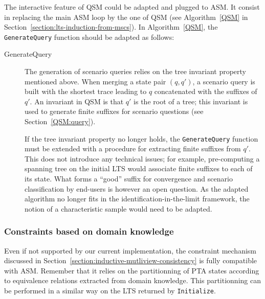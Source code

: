 The interactive feature of QSM could be adapted and plugged to ASM. It consist in replacing the main ASM loop by the one of QSM (see Algorithm~\ref{QSM} in Section~\ref{section:lts-induction-from-mscs}). In Algorithm~\ref{QSM}, the \texttt{GenerateQuery} function should be adapted as follows:
\begin{description}

\item[GenerateQuery] The generation of scenario queries relies on the tree invariant property mentioned above. When merging a state pair $(q,q')$, a scenario query is built with the shortest trace leading to $q$ concatenated with the suffixes of $q'$. An invariant in QSM is that $q'$ is the root of a tree; this invariant is used to generate finite suffixes for scenario questions (see Section~\ref{QSM:query}).

If the tree invariant property no longer holds, the \texttt{GenerateQuery} function must be extended with a procedure for extracting finite suffixes from $q'$. This does not introduce any technical issues; for example, pre-computing a spanning tree on the initial LTS would associate finite suffixes to each of its state. What forms a ``good'' suffix for convergence and scenario classification by end-users is however an open question. As the adapted algorithm no longer fits in the identification-in-the-limit framework, the notion of a characteristic sample would need to be adapted.

\end{description}

\subsubsection*{Constraints based on domain knowledge}

Even if not supported by our current implementation, the constraint mechanism discussed in Section~\ref{section:inductive-mutliview-consistency} is fully compatible with ASM. Remember that it relies on the partitionning of PTA states according to equivalence relations extracted from domain knowledge. This partitionning can be performed in a similar way on the LTS returned by \texttt{Initialize}.

